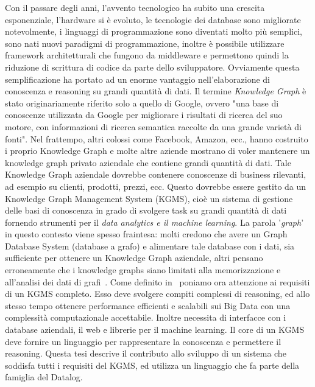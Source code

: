 Con il passare degli anni, l'avvento tecnologico ha subito una crescita esponenziale, l'hardware si è evoluto, le tecnologie dei database sono migliorate notevolmente, i linguaggi di programmazione sono diventati molto più semplici, sono nati nuovi paradigmi di programmazione, inoltre è possibile utilizzare framework architetturali che fungono da middleware e permettono quindi la riduzione di scrittura di codice da parte dello sviluppatore. Ovviamente questa semplificazione ha portato ad un enorme vantaggio nell'elaborazione di conoscenza e reasoning su grandi quantità di dati. \newline
Il termine \emph{Knowledge Graph} è stato originariamente riferito solo a quello di Google, ovvero "una base di conoscenze utilizzata da Google per migliorare i risultati di ricerca del suo motore, con informazioni di ricerca semantica raccolte da una grande varietà di fonti". Nel frattempo, altri colossi come Facebook, Amazon, ecc., hanno costruito i proprio Knowledge Graph e molte altre aziende mostrano di voler mantenere un knowledge graph privato aziendale che contiene grandi quantità di dati. Tale Knowledge Graph aziendale dovrebbe contenere conoscenze di business rilevanti, ad esempio su clienti, prodotti, prezzi, ecc. Questo dovrebbe essere gestito da un Knowledge Graph Management System (KGMS), cioè un sistema di gestione delle basi di conoscenza in grado di svolgere task su grandi quantità di dati fornendo strumenti per il \emph{data analytics e il machine learning}. La parola '\textit{graph}' in questo contesto viene spesso fraintesa: molti credono che avere un Graph Database System (database a grafo) e alimentare tale database con i dati, sia sufficiente per ottenere un Knowledge Graph aziendale, altri pensano erroneamente che i knowledge graphs siano limitati alla memorizzazione e all'analisi dei dati di grafi~\cite{bellomarini2017swift}. \newline
Come definito in~\cite{bellomarini2017swift} poniamo ora attenzione ai requisiti di un KGMS completo. Esso deve svolgere compiti complessi di reasoning, ed allo stesso tempo ottenere performance efficienti e scalabili sui Big Data con una complessit\`a computazionale accettabile. Inoltre necessita di interfacce con i database aziendali, il web e librerie per il machine learning. Il core di un KGMS deve fornire un linguaggio per rappresentare la conoscenza e permettere il reasoning.\newline \newline
Questa tesi descrive il contributo allo sviluppo di un sistema che soddisfa tutti i requisiti del KGMS, ed utilizza un linguaggio che fa parte della famiglia del Datalog. \newline
